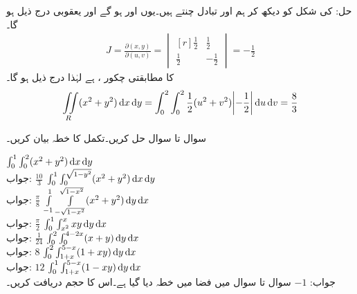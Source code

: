 حل:  کی شکل کو دیکھ کر ہم   اور  تبادل چنتے ہیں۔یوں اور   ہو گے اور یعقوبی درج ذیل ہو گا۔
\begin{align*}
J=\frac{\partial (x,y)}{\partial (u,v)}=
\begin{vmatrix*}[r]
\frac{1}{2}&\frac{1}{2}\\[0.5em]
\frac{1}{2}&-\frac{1}{2}
\end{vmatrix*}=-\frac{1}{2}
\end{align*}
 کا مطابقتی چکور ،  ہے لہٰذا درج ذیل ہو گا۔
\begin{align*}
\iint\limits_R (x^2+y^2)\dif x\dif y=\int_0^2\int_0^2 \frac{1}{2}(u^2+v^2)\abs{-\frac{1}{2}}\dif u\dif v=\frac{8}{3}
\end{align*}

سوال  تا سوال  حل کریں۔تکمل کا خطہ بیان کریں۔

\quad
$\int_0^1\int_0^2 (x^2+y^2)\dif x\dif y$\\
جواب:\quad
$\tfrac{10}{3}$
\quad
$\int_0^1\int_0^{\sqrt{1-y^2}} (x^2+y^2)\dif x\dif y$\\
جواب:\quad
$\tfrac{\pi}{8}$
\quad
$\int\limits_{-1}^1\int\limits_{-\sqrt{1-x^2}}^{\sqrt{1-x^2}} (x^2+y^2)\dif y\dif x$\\
جواب:\quad
$\tfrac{\pi}{2}$
\quad
$\int_{0}^1\int_{x^2}^{x} xy\dif y\dif x$\\
جواب:\quad
$\tfrac{1}{24}$
\quad
$\int_{0}^2\int_{0}^{4-2x} (x+y)\dif y\dif x$\\
جواب:\quad
$8$
\quad
$\int_{0}^2\int_{1+x}^{5-x} (1+xy)\dif y\dif x$\\
جواب:\quad
$12$
\quad
$\int_{0}^1\int_{1+x}^{5-x} (1-xy)\dif y\dif x$\\
جواب:\quad
$-1$
سوال  تا سوال  میں فضا میں خطہ دیا گیا ہے۔اس کا حجم دریافت کریں۔

